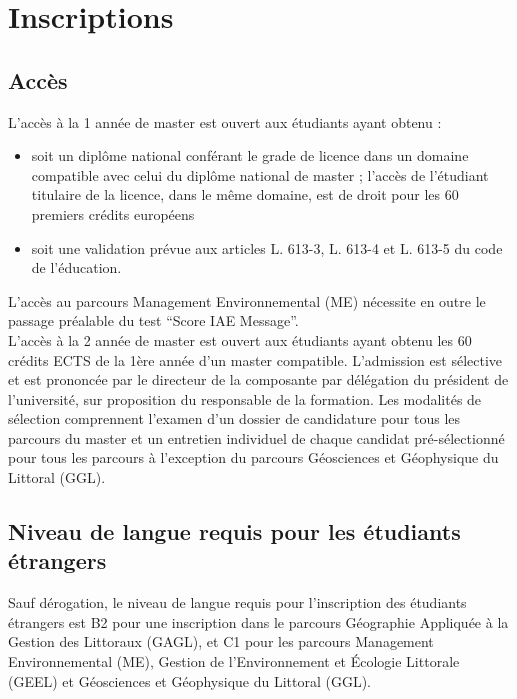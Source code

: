 \documentclass[a4paper,11pt]{article}
\begin{document}


\section{Inscriptions}\label{Inscriptions}
\subsection{Accès}\label{Acces}
\setcounter{page}{1}

L'accès à la 1\iere{} année de master est ouvert aux étudiants ayant obtenu :
\begin{itemize} 
\item soit un diplôme national conférant le grade de licence dans un domaine compatible avec celui du diplôme national de master ; l'accès de l'étudiant titulaire de la licence, dans le même domaine, est de droit pour les 60 premiers crédits européens
\item soit une validation prévue aux articles L. 613-3, L. 613-4 et L. 613-5 du code de l'éducation.
\end{itemize}

L'accès au parcours Management Environnemental (ME) nécessite en outre le passage préalable du test ``Score IAE Message''.\\

L'accès à la 2\ieme{} année de master est ouvert aux étudiants ayant obtenu les 60 crédits ECTS de la 1ère année d'un master compatible. L'admission est sélective et est prononcée par le directeur de la composante par délégation du président de l'université, sur proposition du responsable de la formation. Les modalités de sélection comprennent l'examen d'un dossier de candidature pour tous les parcours du master et un entretien individuel de chaque candidat pré-sélectionné pour tous les parcours à l'exception du parcours Géosciences et Géophysique du Littoral (GGL).


\subsection{Niveau de langue requis pour les étudiants étrangers}\label{langue}
Sauf dérogation, le niveau de langue requis pour l'inscription des étudiants étrangers est B2 pour une inscription dans le parcours Géographie Appliquée à la Gestion des Littoraux (GAGL), et C1 pour les parcours Management Environnemental (ME), Gestion de l'Environnement et Écologie Littorale (GEEL) et Géosciences et Géophysique du Littoral (GGL).
\end{document}
